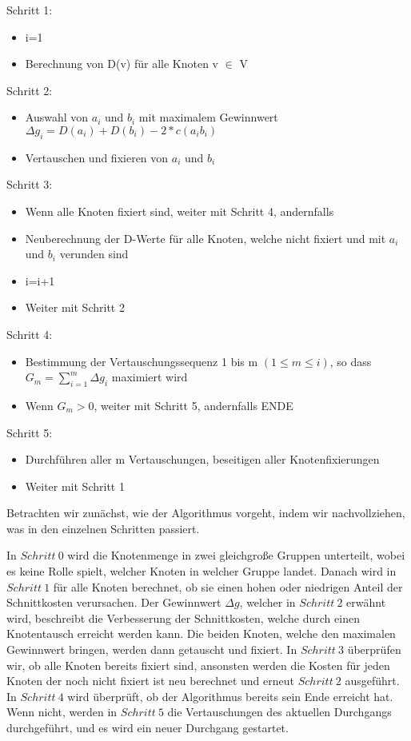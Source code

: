 Schritt 1:
\begin{itemize}
  \item i=1
  \item Berechnung von D(v) für alle Knoten v $\in$ V
\end{itemize}

Schritt 2:
\begin{itemize}
  \item Auswahl von $a_i$ und $b_i$ mit maximalem Gewinnwert $\Delta g_i =
  D(a_i) + D(b_i) - 2 * c(a_i b_i)$
  \item Vertauschen und fixieren von $a_i$ und $b_i$
\end{itemize}


Schritt 3:
\begin{itemize}
  \item Wenn alle Knoten fixiert sind, weiter mit Schritt 4, andernfalls
  \item Neuberechnung der D-Werte für alle Knoten, welche nicht fixiert und
  mit $a_i$ und $b_i$ verunden sind
  \item i=i+1
  \item Weiter mit Schritt 2
\end{itemize}

Schritt 4:
\begin{itemize}
  \item Bestimmung der Vertauschungssequenz 1 bis m $(1 \leq m \leq i)$, so dass
  $G_m = \sum_{i=1}^{m}{\Delta g_i}$ maximiert wird
  \item Wenn $G_m > 0$, weiter mit Schritt 5, andernfalls ENDE
\end{itemize}

Schritt 5:
\begin{itemize}
  \item Durchführen aller m Vertauschungen, beseitigen aller Knotenfixierungen
  \item Weiter mit Schritt 1
\end{itemize}\vspace{10pt}

Betrachten wir zunächst, wie der Algorithmus vorgeht, indem wir
nachvollziehen, was in den einzelnen Schritten passiert.\vspace{10pt}

In $Schritt\ 0$ wird die Knotenmenge in zwei gleichgroße Gruppen unterteilt,
wobei es keine Rolle spielt, welcher Knoten in welcher Gruppe landet. Danach wird in
$Schritt\ 1$ für alle Knoten berechnet, ob sie einen hohen oder niedrigen Anteil
der Schnittkosten verursachen. Der Gewinnwert $\Delta g$, welcher in $Schritt\
2$ erwähnt wird, beschreibt die Verbesserung der Schnittkosten, welche durch
einen Knotentausch erreicht werden kann. Die beiden Knoten, welche den
maximalen Gewinnwert bringen, werden dann getauscht und fixiert. In $Schritt\ 3$
überprüfen wir, ob alle Knoten bereits fixiert sind, ansonsten werden die Kosten
für jeden Knoten der noch nicht fixiert ist neu berechnet und erneut $Schritt\
2$ ausgeführt. In $Schritt\ 4$ wird überprüft, ob der Algorithmus bereits sein
Ende erreicht hat. Wenn nicht, werden in $Schritt\ 5$ die Vertauschungen des
aktuellen Durchgangs durchgeführt, und es wird ein neuer Durchgang gestartet.\vspace{10pt}

